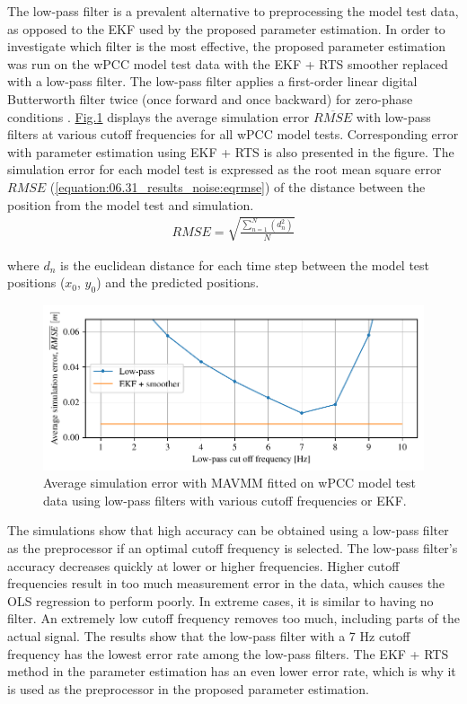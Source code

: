 The low-pass filter is a prevalent alternative to preprocessing the model test data, as opposed to the EKF used by the proposed parameter estimation.
In order to investigate which filter is the most effective, the proposed parameter estimation was run on the wPCC model test data with the EKF + RTS smoother replaced with a low-pass filter. The low-pass filter applies a first-order linear digital Butterworth filter twice (once forward and once backward) for zero-phase conditions \cite{virtanen_scipy_2020}. \hyperref[\detokenize{06.31_results_noise:fig-lowpass-accuracy}]{Fig.\@ \ref{\detokenize{06.31_results_noise:fig-lowpass-accuracy}}} displays the average simulation error \( \overline{RMSE} \) with low-pass filters at various cutoff frequencies for all wPCC model tests. Corresponding error with parameter estimation using EKF + RTS is also presented in the figure. The simulation error for each model test is expressed as the root mean square error \(RMSE\) (\autoref{equation:06.31_results_noise:eqrmse}) of the distance between the position from the model test and simulation.
\begin{equation}\label{equation:06.31_results_noise:eqrmse}
\begin{split}RMSE=\sqrt{ \frac{\sum_{n=1}^{N} (d_n^2) }{N}} \end{split}
\end{equation}

\noindent where \(d_n\) is the euclidean distance for each time step between the model test positions (\(x_0\), \(y_0\)) and the predicted positions.

\begin{figure}[h!]
\centering
\includegraphics[width=1.0\textwidth]{kappa/images/6.pdf}
\caption{Average simulation error with MAVMM fitted on wPCC model test data using low-pass filters with various cutoff frequencies or EKF.}\label{\detokenize{06.31_results_noise:fig-lowpass-accuracy}}\end{figure} 
\noindent The simulations show that high accuracy can be obtained using a low-pass filter as the preprocessor if an optimal cutoff frequency is selected. The low-pass filter's accuracy decreases quickly at lower or higher frequencies. Higher cutoff frequencies result in too much measurement error in the data, which causes the OLS regression to perform poorly. In extreme cases, it is similar to having no filter. An extremely low cutoff frequency removes too much, including parts of the actual signal. The results show that the low-pass filter with a 7 Hz cutoff frequency has the lowest error rate among the low-pass filters. The EKF + RTS method in the parameter estimation has an even lower error rate, which is why it is used as the preprocessor in the proposed parameter estimation.
